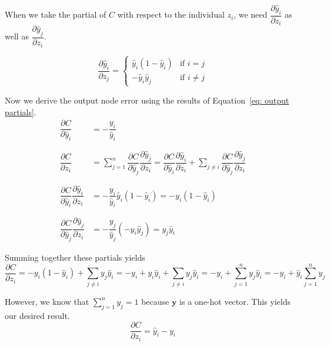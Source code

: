 \documentclass[pageno]{final_paper}
\begin{document}
When we take the partial of $C$ with respect to the individual $z_i$, we need
$\dfrac{\partial \hat{y}_i}{\partial z_i}$ as well as $\dfrac{\partial
\hat{y}_j}{\partial z_i}$.

$$
\dfrac{\partial \hat{y}_i}{\partial z_j} =
\begin{cases}
    \hat{y}_i(1-\hat{y}_i) & \text{if } i = j \\
    -\hat{y}_i\hat{y}_j & \text{if } i \neq j
\end{cases}
$$

Now we derive the output node error using the results of Equation~\eqref{eq: output partials}.
\begin{equation}
    \label{eq: loss function partial to h}
    \begin{aligned}
        \dfrac{\partial C}{\partial \hat{y}_i} &= -\dfrac{y_i}{\hat{y}_i} \\
        &\phantom{=} \\
        \dfrac{\partial C}{\partial z_i} &= \sum\limits_{j=1}^n \dfrac{\partial C}{\partial \hat{y}_j}\dfrac{\partial \hat{y}_j}{\partial z_i} =
            \dfrac{\partial C}{\partial \hat{y}_i}\dfrac{\partial \hat{y}_i}{\partial z_i} + \sum\limits_{j\neq i} \dfrac{\partial C}{\partial \hat{y}_j}\dfrac{\partial \hat{y}_j}{\partial z_i} \\
        &\phantom{=} \\
        \dfrac{\partial C}{\partial \hat{y}_i}\dfrac{\partial \hat{y}_i}{\partial z_i} &= -\dfrac{y_i}{\hat{y}_i} \hat{y}_i (1-\hat{y}_i) = -y_i(1-\hat{y}_i) \\
        &\phantom{=} \\
        \dfrac{\partial C}{\partial \hat{y}_j}\dfrac{\partial \hat{y}_j}{\partial z_i} &= -\dfrac{y_j}{\hat{y}_j} \left(-\hat{y}_i\hat{y}_j\right) = y_j\hat{y}_i
    \end{aligned}
\end{equation}

Summing together these partials yields
\begin{equation}
    \dfrac{\partial C}{\partial z_i} = -y_i(1-\hat{y}_i) + \sum\limits_{j\neq i} y_j\hat{y}_i =
        -y_i + y_i\hat{y}_i + \sum\limits_{j\neq i} y_j\hat{y}_i = -y_i + \sum\limits_{j = 1}^n y_j\hat{y}_i = -y_i + \hat{y}_i\sum\limits_{j=1}^n y_j
\end{equation}

However, we know that $\sum_{j=1}^n y_j = 1$ because $\mathbf{y}$ is a one-hot vector. This
yields our desired result.
\begin{equation}
    \dfrac{\partial C}{\partial z_i} = \hat{y}_i - y_i
\end{equation}
\end{document}
